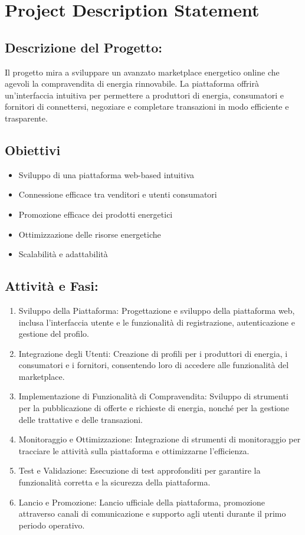 \documentclass{report}
\begin{document}
\chapter*{Project Description Statement}

\section*{Descrizione del Progetto:}
Il progetto mira a sviluppare un avanzato marketplace energetico online che agevoli la compravendita di energia rinnovabile. La piattaforma offrirà un'interfaccia intuitiva per permettere a produttori di energia, consumatori e fornitori di connettersi, negoziare e completare transazioni in modo efficiente e trasparente.


\section*{Obiettivi}
\begin{itemize}
    \item Sviluppo di una piattaforma web-based intuitiva
    \item Connessione efficace tra venditori e utenti consumatori
    \item Promozione efficace dei prodotti energetici
    \item Ottimizzazione delle risorse energetiche
    \item Scalabilità e adattabilità
\end{itemize}

\section*{Attività e Fasi:}
\begin{enumerate}
    \item Sviluppo della Piattaforma: Progettazione e sviluppo della piattaforma web, inclusa l'interfaccia utente e le funzionalità di registrazione, autenticazione e gestione del profilo.
    \item Integrazione degli Utenti: Creazione di profili per i produttori di energia, i consumatori e i fornitori, consentendo loro di accedere alle funzionalità del marketplace.
    \item Implementazione di Funzionalità di Compravendita: Sviluppo di strumenti per la pubblicazione di offerte e richieste di energia, nonché per la gestione delle trattative e delle transazioni.
    \item Monitoraggio e Ottimizzazione: Integrazione di strumenti di monitoraggio per tracciare le attività sulla piattaforma e ottimizzarne l'efficienza.
    \item Test e Validazione: Esecuzione di test approfonditi per garantire la funzionalità corretta e la sicurezza della piattaforma.
    \item Lancio e Promozione: Lancio ufficiale della piattaforma, promozione attraverso canali di comunicazione e supporto agli utenti durante il primo periodo operativo.
\end{enumerate}
\end{document}
